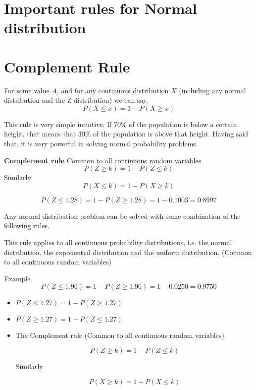 \documentclass[]{report}
\begin{document}
\section{Important rules for Normal distribution}

\section{Complement Rule}
For some value $A$, and for any continuous distribution $X$ (including any normal distribution and the Z distribution) we can say.
\[ P(X \leq x) = 1 - P(X \geq x) \]

This rule is very simple intuitive. If 70\% of the population is below a certain height, that means that 30\% of the population is above that height. Having said that, it is very powerful in solving normal probability problems.

 \textbf{Complement rule}
  Common to all continuous random variables
 \[P(Z \geq k) = 1 - P(Z \leq k) \]
 Similarly
 \[P(X \leq k) = 1 - P(X \geq k) \]
 
 
 \[P(Z \leq 1.28) = 1 - P(Z \geq 1.28)  = 1-0.1003 = 0.8997\]

Any normal distribution problem can be solved with some combination of the following rules.



This rule applies to all continuous probability distributions, i.e. the normal distribution, the exponential distribution and the uniform distribution.
(Common to all continuous random variables) 


Example
\[P(Z \leq 1.96)   = 1 - P(Z \geq 1.96)   = 1 - 0.0250 = 0.9750\]


\begin{itemize}
\item $P(Z \leq 1.27) = 1-P(Z \geq 1.27) $
\item $ P(Z \geq 1.27) = 1-P(Z \leq 1.27) $
\end{itemize}
\begin{itemize} \item The Complement rule (Common to all continuous random variables)

\[P(Z \geq k) = 1 - P(Z \leq k) \]


Similarly

\[P(X \geq k) = 1 - P(X \leq k) \]

\end{itemize}
\end{document}
